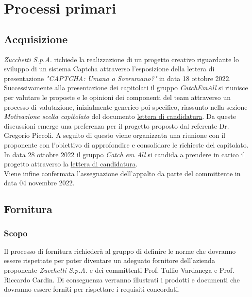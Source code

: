 \section{Processi primari}
\subsection{Acquisizione}
\textit{Zucchetti S.p.A.} richiede la realizzazione di un progetto creativo riguardante lo sviluppo di un sistema Captcha attraverso l'esposizione della lettera di presentazione \textit{"CAPTCHA: Umano o Sovrumano?"} in data 18 ottobre 2022.\\
Successivamente alla presentazione dei capitolati il gruppo \textit{CatchEmAll} si riunisce per valutare le proposte e le opinioni dei componenti del team attraverso un processo di valutazione, inizialmente generico poi specifico, riassunto nella sezione \textit{Motivazione scelta capitolato} del documento \href{https://github.com/catchEmAll-SWE/catchEmAll-Docs/blob/main/Assegnazione appalti/LetteraCandidatura.pdf}{lettera di candidatura}. Da queste discussioni emerge una preferenza per il progetto proposto dal referente Dr. Gregorio Piccoli. 
A seguito di questo viene organizzata una riunione con il proponente con l'obiettivo di approfondire e consolidare le richieste del capitolato. \\ 
In data 28 ottobre 2022 il gruppo \textit{Catch em All} si candida a prendere in carico il progetto attraverso la \href{https://github.com/catchEmAll-SWE/catchEmAll-Docs/blob/main/Assegnazione appalti/LetteraCandidatura.pdf}{lettera di candidatura}.\\
Viene infine confermata l'assegnazione dell'appalto da parte del committente in data 04 novembre 2022.


\subsection{Fornitura}
\subsubsection{Scopo}
Il processo di fornitura richiederà al gruppo di definire le norme che dovranno essere rispettate per poter diventare un adeguato fornitore dell'azienda proponente \textit{Zucchetti S.p.A.} e dei committenti Prof. Tullio Vardanega e Prof. Riccardo Cardin. Di conseguenza verranno illustrati i prodotti e documenti che dovranno essere forniti per rispettare i requisiti concordati.
